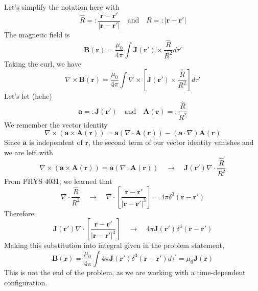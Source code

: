 \documentclass[a4paper,12pt]{article} %
\begin{document}
Let's simplify the notation here with
$$ \hat{R} =: \frac{\mathbf{r} - \mathbf{r}'}{|\mathbf{r} - \mathbf{r}'|} \quad \text{and} \quad R =: |\mathbf{r} - \mathbf{r}'| $$
The magnetic field is
$$ \mathbf{B}(\mathbf{r}) = \frac{\mu_0}{4\pi} \int \mathbf{J}(\mathbf{r}')\times \frac{\hat{R}}{R^2} d\tau' $$
Taking the curl, we have
$$ \nabla \times \mathbf{B}(\mathbf{r}) = \frac{\mu_0}{4\pi} \int \nabla \times \left[ \mathbf{J}(\mathbf{r}')\times \frac{\hat{R}}{R^2} \right] d\tau'$$
Let's let (hehe)
$$ \mathbf{a} =: \mathbf{J}(\mathbf{r}') \quad\text{and}\quad \mathbf{A}(\mathbf{r}) =: \frac{\hat{R}}{R^2} $$
We remember the vector identity
$$ \nabla\times\left(\mathbf{a} \times \mathbf{A}(\mathbf{r})\right) = \mathbf{a}\left(\nabla\cdot\mathbf{A}(\mathbf{r})\right) - \left(\mathbf{a}\cdot\nabla\right)\mathbf{A}(\mathbf{r}) $$
Since $\mathbf{a}$ is independent of $\mathbf{r}$, the second term of our vector identity vanishes and we are left with
$$ \nabla\times\left(\mathbf{a} \times \mathbf{A}(\mathbf{r})\right) = \mathbf{a}\left(\nabla\cdot\mathbf{A}(\mathbf{r})\right) \quad\rightarrow\quad \mathbf{J}(\mathbf{r}')\nabla \cdot \frac{\hat{R}}{R^2} $$
From PHYS 4031, we learned that
$$ \nabla \cdot \frac{\hat{R}}{R^2} \quad\rightarrow\quad \nabla \cdot \left[\frac{\mathbf{r} - \mathbf{r}'}{|\mathbf{r} - \mathbf{r}'|^3}\right] = 4\pi\delta^3(\mathbf{r} - \mathbf{r}') $$
Therefore
$$ \mathbf{J}(\mathbf{r}')\nabla \cdot \left[\frac{\mathbf{r} - \mathbf{r}'}{|\mathbf{r} - \mathbf{r}'|^3}\right] \quad\rightarrow\quad 4\pi\mathbf{J}(\mathbf{r}')\delta^3(\mathbf{r} - \mathbf{r}') $$
Making this substitution into integral given in the problem statement,
$$ \boxed{\mathbf{B}(\mathbf{r})=\frac{\mu_0}{4 \pi} \int 4\pi\mathbf{J}(\mathbf{r}')\delta^3(\mathbf{r} - \mathbf{r}') d \tau^{\prime} = \mu_0\mathbf{J}(\mathbf{r})} $$
This is not the end of the problem, as we are working with a time-dependent configuration.\\
\end{document}
